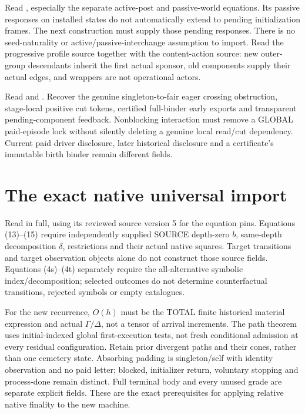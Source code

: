 \documentclass{article}
\begin{document}
Read , especially the separate active-post and passive-world equations. Its passive responses on installed states do not automatically extend to pending initialization frames. The next construction must supply those pending responses. There is no seed-naturality or active/passive-interchange assumption to import. Read the progressive profile source  together with the content-action source: new outer-group descendants inherit the first actual sponsor, old components supply their actual edges, and wrappers are not operational actors.

Read  and . Recover the genuine singleton-to-fair eager crossing obstruction, stage-local positive cut tokens, certified full-binder early exports and transparent pending-component feedback. Nonblocking interaction must remove a GLOBAL paid-episode lock without silently deleting a genuine local read/cut dependency. Current paid driver disclosure, later historical disclosure and a certificate's immutable birth binder remain different fields.

\section{The exact native universal import}
Read  in full, using its reviewed source version 5 for the equation pins. Equations (13)--(15) require independently supplied SOURCE depth-zero $b$, same-depth decomposition $\delta$, restrictions and their actual native squares. Target transitions and target observation objects alone do not construct those source fields. Equations (4s)--(4t) separately require the all-alternative symbolic index/decomposition; selected outcomes do not determine counterfactual transitions, rejected symbols or empty catalogues.

For the new recurrence, $O(h)$ must be the TOTAL finite historical material expression and actual $\Gamma/\Delta$, not a tensor of arrival increments. The path theorem uses initial-indexed global first-execution tests, not fresh conditional admission at every residual configuration. Retain prior divergent paths and their cones, rather than one cemetery state. Absorbing padding is singleton/self with identity observation and no paid letter; blocked, initializer return, voluntary stopping and process-done remain distinct. Full terminal body and every unused grade are separate explicit fields. These are the exact prerequisites for applying relative native finality to the new machine.
\end{document}
